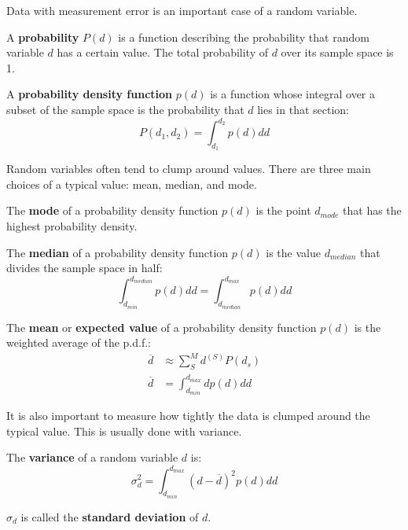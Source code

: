 \documentclass{article}
\begin{document}
Data with measurement error is an important case of a random variable.

\begin{definition}
    A \textbf{probability} \(P(d)\) is a function describing the probability that 
    random variable \(d\) has a certain value. The total probability of \(d\) over its sample space is 1.
\end{definition}

\begin{definition}
    A \textbf{probability density function} \(p(d)\) is a function whose integral over a subset of the sample space is 
    the probability that \(d\) lies in that section:
    \[
        P(d_1,d_2)=\int_{d_1}^{d_2}p(d)d d
    \]
\end{definition}

Random variables often tend to clump around values. There are three main choices of a typical value: mean, median, and mode.

\begin{definition}
    The \textbf{mode} of a probability density function \(p(d)\) is the point \(d_{mode}\) that has the highest 
    probability density. 
\end{definition}

\begin{definition}
    The \textbf{median} of a probability density function \(p(d)\) is the value \(d_{median}\) that divides the sample space in half:
    \[
        \int_{d_{min}}^{d_{median}}p(d)dd=\int_{d_{median}}^{d_{max}}p(d)dd
    \]
\end{definition}

\begin{definition}
    The \textbf{mean} or \textbf{expected value} of a probability density function \(p(d)\) is the weighted average of the p.d.f.:
    \begin{align*}
        \overline{d}&\approx \sum_S^M d^{(S)}P(d_s) \\
        \overline{d}&= \int_{d_{min}}^{d_{max}}d p(d) dd
    \end{align*}
\end{definition}

It is also important to measure how tightly the data is clumped around the typical value. This is usually done 
with variance.

\begin{definition}
    The \textbf{variance} of a random variable \(d\)  is:
    \[
        \sigma_d^2=\int_{d_{min}}^{d_{max}}(d-\overline{d} )^2p(d)dd
    \] 

    \(\sigma_d\) is called the \textbf{standard deviation} of \(d\).  
\end{definition}
\end{document}
